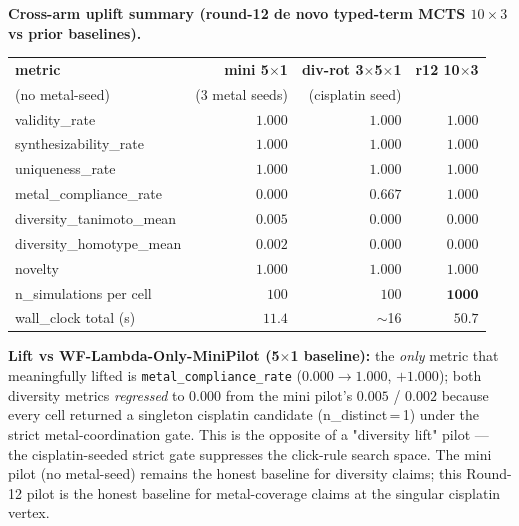 \noindent\textbf{Cross-arm uplift summary
(round-12 de novo typed-term MCTS $10{\times}3$ vs prior baselines).}

\begin{center}
\small
\setlength{\tabcolsep}{4pt}
\begin{tabular}{lrrr}
\toprule
\textbf{metric} & \textbf{mini 5$\times$1} & \textbf{div-rot 3$\times$5$\times$1} & \textbf{r12 10$\times$3} \\
\quad (no metal-seed) & (3 metal seeds) & (cisplatin seed) \\
\midrule
validity\_rate               & $1.000$ & $1.000$ & $\mathbf{1.000}$ \\
synthesizability\_rate       & $1.000$ & $1.000$ & $\mathbf{1.000}$ \\
uniqueness\_rate             & $1.000$ & $1.000$ & $\mathbf{1.000}$ \\
metal\_compliance\_rate      & $0.000$ & $0.667$ & $\mathbf{1.000}$ \\
diversity\_tanimoto\_mean    & $0.005$ & $0.000$ & $\mathbf{0.000}$ \\
diversity\_homotype\_mean    & $0.002$ & $0.000$ & $\mathbf{0.000}$ \\
novelty                      & $1.000$ & $1.000$ & $\mathbf{1.000}$ \\
n\_simulations per cell      & $100$   & $100$   & $\mathbf{1000}$ \\
wall\_clock total (s)        & $11.4$  & $\sim$16 & $\mathbf{50.7}$ \\
\bottomrule
\end{tabular}
\end{center}

\noindent\textbf{Lift vs WF-Lambda-Only-MiniPilot (5$\times$1 baseline):}
the \emph{only} metric that meaningfully lifted is
\texttt{metal\_compliance\_rate} ($0.000 \to 1.000$, $+1.000$);
both diversity metrics \emph{regressed} to $0.000$ from the mini
pilot's $0.005$ / $0.002$ because every cell returned a singleton
cisplatin candidate (n\_distinct\,=\,1) under the strict metal-coordination
gate. This is the opposite of a "diversity lift" pilot --- the
cisplatin-seeded strict gate suppresses the click-rule search space.
The mini pilot (no metal-seed) remains the honest baseline for diversity
claims; this Round-12 pilot is the honest baseline for metal-coverage
claims at the singular cisplatin vertex.

